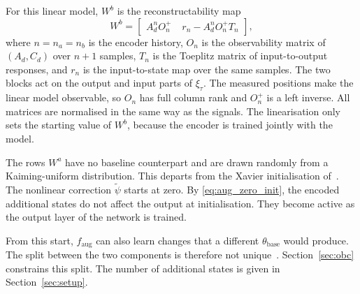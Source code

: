 For this linear model, $W^b$ is the reconstructability
map~\cite[Eqs.~(16), (17)]{hoekstra2026encoder}
\begin{equation}
 W^b=\begin{bmatrix}
  A_d^nO_n^{+} & \;r_n-A_d^nO_n^{+}T_n
 \end{bmatrix},
 \label{eq:aug_wb}
\end{equation}
where $n=n_a=n_b$ is the encoder history, $O_n$ is the observability matrix
of $(A_d,C_d)$ over $n+1$ samples, $T_n$ is the Toeplitz matrix of
input-to-output responses, and $r_n$ is the input-to-state map over the same
samples.
The two blocks act on the output and input parts of $\xi_\tau$.
The measured positions make the linear model observable, so $O_n$ has full
column rank and $O_n^{+}$ is a left inverse.
All matrices are normalised in the same way as the signals.
The linearisation only sets the starting value of $W^b$, because the encoder
is trained jointly with the model.

The rows $W^a$ have no baseline counterpart and are drawn randomly from a
Kaiming-uniform distribution.
This departs from the Xavier initialisation
of~\cite[Sec.~5.4.2]{hoekstra2026lfr}.
The nonlinear correction $\tilde\psi$ starts at zero.
By \eqref{eq:aug_zero_init}, the encoded additional states do not affect the
output at initialisation.
They become active as the output layer of the network is trained.

From this start, $f_{\mathrm{aug}}$ can also learn changes that a different
$\theta_{\mathrm{base}}$ would produce.
The split between the two components is therefore not
unique~\cite[Sec.~5.2]{hoekstra2026lfr}.
Section~\ref{sec:obc} constrains this split.
The number of additional states is given in Section~\ref{sec:setup}.

